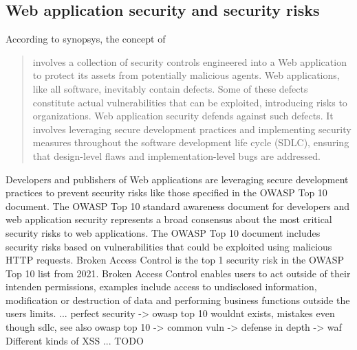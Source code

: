 \subsection{Web application security and security risks}
According to synopsys, the concept of  
\begin{quote}
involves a collection of security controls engineered into a Web application to protect its assets from potentially malicious agents. Web applications, like all software, inevitably contain defects. Some of these defects constitute actual vulnerabilities that can be exploited, introducing risks to organizations. Web application security defends against such defects. It involves leveraging secure development practices and implementing security measures throughout the software development life cycle (SDLC), ensuring that design-level flaws and implementation-level bugs are addressed.
\end{quote}
Developers and publishers of Web applications are leveraging secure development practices to prevent security risks like those specified in the OWASP Top 10 document. 
The OWASP Top 10 standard awareness document for developers and web application security represents a broad consensus about the most critical security risks to web applications.
The OWASP Top 10 document includes security risks based on vulnerabilities that could be exploited using malicious HTTP requests. 
Broken Access Control is the top 1 security risk in the OWASP Top 10 list from 2021.
Broken Access Control enables users to act outside of their intenden permissions, examples include access to undisclosed information, modification or destruction of data and performing business functions outside the users limits. \cite{OWASP/BrokenAccessControl}
... \cite{OWASP/Top10}
{\color{red} perfect security -> owasp top 10 wouldnt exists, mistakes even though sdlc, see also owasp top 10 -> common vuln -> defense in depth -> waf }
Different kinds of XSS ...
{\color{red}TODO}
